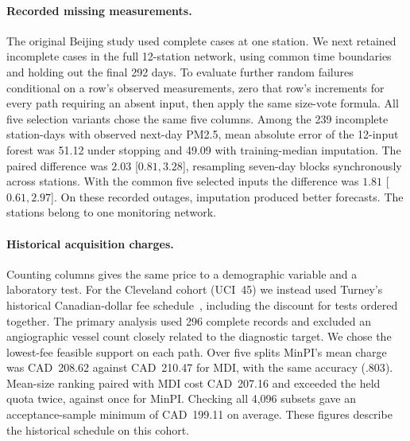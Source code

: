 \paragraph{Recorded missing measurements.}
The original Beijing study used complete cases at one station. We next
retained incomplete cases in the full 12-station network, using common
time boundaries and holding out the final 292 days. To evaluate further
random failures conditional on a row's observed measurements, zero that
row's increments for every path requiring an absent input, then apply
the same size-vote formula. All five selection variants chose the same
five columns. Among the 239 incomplete station-days with observed next-day
PM2.5, mean absolute error of the 12-input forest was 51.12 under stopping
and 49.09 with training-median imputation. The paired difference was
$2.03$ [$0.81,3.28$], resampling seven-day blocks synchronously across
stations. With the common five selected inputs the difference was
$1.81$ [$0.61,2.97$]. On these recorded outages, imputation produced
better forecasts. The stations belong to one monitoring network.

\paragraph{Historical acquisition charges.}
Counting columns gives the same price to a demographic variable and a
laboratory test. For the Cleveland cohort (UCI~45) we instead used
Turney's historical Canadian-dollar fee schedule~\citep{turney1995cost}, including the discount
for tests ordered together. The primary analysis used 296 complete records
and excluded an angiographic vessel count closely related to the diagnostic
target. We chose the lowest-fee feasible support on each path. Over five
splits MinPI's mean charge was CAD~208.62 against CAD~210.47 for MDI, with
the same accuracy ($.803$). Mean-size ranking paired with MDI cost
CAD~207.16 and exceeded the held quota twice, against once for MinPI.
Checking all 4,096 subsets gave an acceptance-sample minimum of CAD~199.11
on average. These figures describe the historical schedule on this cohort.


